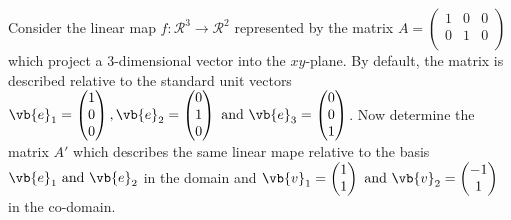 \documentclass[a4paper,12pt]{report}
\begin{document}
{Consider the linear map \(f:\mathcal{R}^3 \to \mathcal{R}^2\) represented by the matrix \(A = \begin{pmatrix}
    1 & 0 &  0 \\
    0 & 1 &  0 \\
\end{pmatrix}\) which project a 3-dimensional vector into the \(xy\)-plane. By default, the matrix is described relative to the standard unit vectors \(\vb{e} _{1} = \begin{pmatrix}
     1 \\
     0 \\
     0 \\
\end{pmatrix}, \vb{e} _{2} = \begin{pmatrix}
     0 \\
     1 \\
     0 \\
\end{pmatrix} \text { and } \vb{e} _{3} = \begin{pmatrix}
     0 \\
     0 \\
     1 \\
\end{pmatrix}\). Now determine the matrix \(A'\) which describes the same linear mape relative to the basis \(\vb{e} _{1}\text { and } \vb{e} _{2}  \) in the domain and \(\vb{v} _{1} = \begin{pmatrix}
     1 \\
     1 \\
\end{pmatrix} \text { and } \vb{v} _{2} = \begin{pmatrix}
     -1 \\
     1 \\
\end{pmatrix} \) in the co-domain.    }
\end{document}
